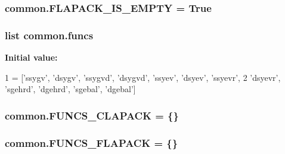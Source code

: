 \subsubsection[{F\+L\+A\+P\+A\+C\+K\+\_\+\+I\+S\+\_\+\+E\+M\+P\+T\+Y}]{\setlength{\rightskip}{0pt plus 5cm}common.\+F\+L\+A\+P\+A\+C\+K\+\_\+\+I\+S\+\_\+\+E\+M\+P\+T\+Y = {\bf True}}\label{namespacecommon_a86727e0a6204bf433109e992c835145c}
\hypertarget{namespacecommon_a8a91825dd6261030746d71fea14d0dee}{}
\subsubsection[{funcs}]{\setlength{\rightskip}{0pt plus 5cm}list common.\+funcs}\label{namespacecommon_a8a91825dd6261030746d71fea14d0dee}
{\bfseries Initial value\+:}
\begin{DoxyCode}
1 = [\textcolor{stringliteral}{'ssygv'}, \textcolor{stringliteral}{'dsygv'}, \textcolor{stringliteral}{'ssygvd'}, \textcolor{stringliteral}{'dsygvd'}, \textcolor{stringliteral}{'ssyev'}, \textcolor{stringliteral}{'dsyev'}, \textcolor{stringliteral}{'ssyevr'},
2          \textcolor{stringliteral}{'dsyevr'}, \textcolor{stringliteral}{'sgehrd'}, \textcolor{stringliteral}{'dgehrd'}, \textcolor{stringliteral}{'sgebal'}, \textcolor{stringliteral}{'dgebal'}]
\end{DoxyCode}
\hypertarget{namespacecommon_a442ede8f273c2db8418c5c40d7f9e7f3}{}
\subsubsection[{F\+U\+N\+C\+S\+\_\+\+C\+L\+A\+P\+A\+C\+K}]{\setlength{\rightskip}{0pt plus 5cm}common.\+F\+U\+N\+C\+S\+\_\+\+C\+L\+A\+P\+A\+C\+K = \{\}}\label{namespacecommon_a442ede8f273c2db8418c5c40d7f9e7f3}
\hypertarget{namespacecommon_a3de6c4e8a7ab18751c167d9bdd956b15}{}
\subsubsection[{F\+U\+N\+C\+S\+\_\+\+F\+L\+A\+P\+A\+C\+K}]{\setlength{\rightskip}{0pt plus 5cm}common.\+F\+U\+N\+C\+S\+\_\+\+F\+L\+A\+P\+A\+C\+K = \{\}}\label{namespacecommon_a3de6c4e8a7ab18751c167d9bdd956b15}
\hypertarget{namespacecommon_a5ffbc785fdd71516c72c0781cb363dfa}{}
